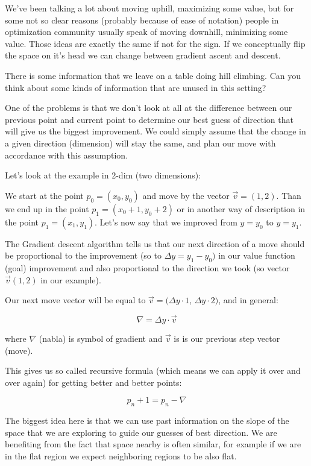 We’ve been talking a lot about moving uphill, maximizing some value, but for some not so clear reasons (probably because of ease of notation) people in optimization community usually speak of moving downhill, minimizing some value. Those ideas are exactly the same if not for the sign. If we conceptually flip the space on it’s head we can change between gradient ascent and descent.

There is some information that we leave on a table doing hill climbing. Can you think about some kinds of information that are unused in this setting?

One of the problems is that we don’t look at all at the difference between our previous point and current point to determine our best guess of direction that will give us the biggest improvement. We could simply assume that the change in a given direction (dimension) will stay the same, and plan our move with accordance with this assumption.

Let’s look at the example in 2-dim (two dimensions):

We start at the point $p_0 = (x_0, y_0)$ and move by the vector $\vec{v} = (1, 2)$. Than we end up in the point $p_1 = (x_0 + 1, y_0 + 2)$ or in another way of description in the point $p_1 = (x_1, y_1)$. Let’s now say that we improved from $y = y_0$ to $y = y_1$.

The Gradient descent algorithm tells us that our next direction of a move should be proportional to the improvement (so to $\Delta y = y_1 - y_0)$ in our value function (goal) improvement and also proportional to the direction we took (so vector $\vec{v}(1, 2)$  in our example).

Our next move vector will be equal to $\vec{v} = (\Delta y \cdot 1$, $\Delta y \cdot 2)$, and in general:

\begin{equation}
	\nabla = \Delta y \cdot \vec{v}
\end{equation}

\noindent where $\nabla$ (nabla) is symbol of gradient and  $\vec{v}$ is is our previous step vector (move).

This gives us so called recursive formula (which means we can apply it over and over again) for getting better and better points:

\begin{equation}
	p_n + 1 = p_{n} - \nabla
\end{equation}


The biggest idea here is that we can use past information on the slope of the space that we are exploring to guide our guesses of best direction. We are benefiting from the fact that space nearby is often similar, for example if we are in the flat region we expect neighboring regions to be also flat. 

